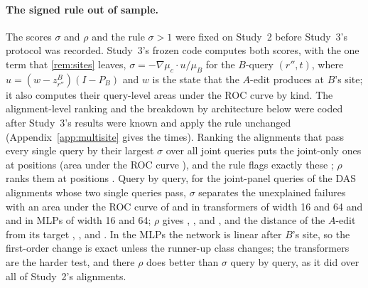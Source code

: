 \paragraph{The signed rule out of sample.}
The scores $\sigma$ and $\rho$ and the rule $\sigma>1$ were fixed on Study~2 before Study~3's protocol was recorded.
Study~3's frozen code computes both scores, with the one term that \cref{rem:sites} leaves,
$\sigma=-\nabla\mu_c\cdot u/\mu_B$ for the $B$-query $(r'',t)$, where $u=(w-z^B_{r''})(I-P_B)$ and $w$ is the state
that the $A$-edit produces at $B$'s site; it also computes their query-level areas under the ROC curve by kind. The
alignment-level ranking and the breakdown by architecture below were coded after Study~3's results were known and
apply the rule unchanged (Appendix~\ref{app:multisite} gives the times). Ranking the \MsPerfect{} alignments that
pass every single query by their largest $\sigma$ over all joint queries puts the \MsPerfectJointFail{} joint-only
ones at positions \MsSrRanksSigma{} (area under the
ROC curve \MsSrAlignAucSigma), and the rule flags exactly these \MsSrFlagged{}; $\rho$ ranks them at positions
\MsSrRanksRho. Query by query, for the joint-panel queries of the DAS alignments whose two single queries pass, $\sigma$
separates the unexplained failures with an area under the ROC curve of \MsSrAucSigmaTs{} and \MsSrAucSigmaTl{} in
transformers of width 16 and 64 and \MsSrAucSigmaMs{} and \MsSrAucSigmaMl{} in MLPs of width 16 and 64; $\rho$ gives
\MsSrAucRhoTs, \MsSrAucRhoTl, \MsSrAucRhoMs{} and \MsSrAucRhoMl, and the distance of the $A$-edit from its target
\MsSrAucDistTs, \MsSrAucDistTl, \MsSrAucDistMs{} and \MsSrAucDistMl. In the MLPs the network is linear after $B$'s
site, so the first-order change is exact unless the runner-up class changes; the transformers are the harder test,
and there $\rho$ does better than $\sigma$ query by query, as it did over all of Study~2's alignments.
